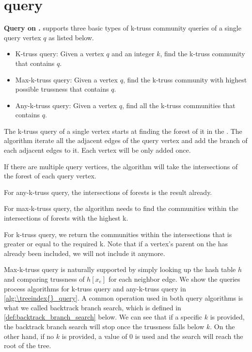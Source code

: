 \section{\Probdef{} query}
\label{query}

\vskip 0.1in \noindent \textbf{Query on \TreeIndex{}.}
\Treeindex{} supports three basic types of k-truss community queries of a single query vertex $q$ as listed below.

\begin{itemize}
	\item{K-truss query:} Given a vertex $q$ and an integer $k$, find the k-truss community that contains $q$.
	\item{Max-k-truss query:} Given a vertex $q$, find the k-truss community with highest possible trussness that contains $q$.
	\item{Any-k-truss query:} Given a vertex $q$, find all the k-truss communities that contains $q$.
\end{itemize}


The k-truss query of a single vertex starts at finding the forest of it in the \treeindex{}. The algorithm iterate all the adjacent edges of the query vertex and add the branch of each adjacent edges to it. Each \treeindex{} vertex will be only added once.

If there are multiple query vertices, the algorithm will take the intersections of the forest of each query vertex.

For any-k-truss query, the intersections of forests is the result already.

For max-k-truss query, the algorithm needs to find the communities within the intersections of forests with the highest k.

For k-truss query, we return the communities within the intersections that is greater or equal to the required k. Note that if a vertex's parent on the \treeindex{} has already been included, we will not include it anymore.

Max-k-truss query is naturally supported by simply looking up the hash table $h$ and comparing trussness of $h[x_e]$ for each neighbor edge. We show the queries process algorithms for k-truss query and any-k-truss query in \autoref{alg:\treeindex{}_query}. A common operation used in both query algorithms is what we called backtrack branch search, which is defined in \autoref{def:backtrack_branch_search} below. We can see that if a specific $k$ is provided, the backtrack branch search will stop once the trussness falls below $k$. On the other hand, if no $k$ is provided, a value of $0$ is used and the search will reach the root of the tree.

